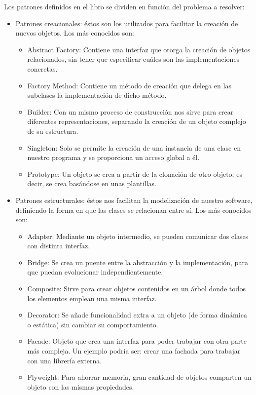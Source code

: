\documentclass[12pt]{report} %
\begin{document}
	 Los patrones definidos en el libro \cite{gamma2002patrones} se dividen en función del problema a resolver:
	 
	 \begin{itemize}
	 	\item Patrones creacionales: éstos son los utilizados para facilitar la creación de nuevos objetos. Los más conocidos son:	 	
	 	\begin{itemize}
	 		\item Abstract Factory: Contiene una interfaz que otorga la creación de objetos relacionados, sin tener que especificar cuáles son las implementaciones concretas.
	 		\item Factory Method: Contiene un método de creación que delega en las subclases la implementación de dicho método.
	 		\item Builder: Con un mismo proceso de construcción nos sirve para crear diferentes representaciones, separando la creación de un objeto complejo de su estructura.
	 		\item Singleton: Solo se permite la creación de una instancia de una clase en nuestro programa y se proporciona un acceso global a él.
	 		\item Prototype: Un objeto se crea a partir de la clonación de otro objeto, es decir, se crea basándose en unas plantillas.
	 	\end{itemize}
 	\item Patrones estructurales: éstos nos facilitan la modelización de nuestro software, definiendo la forma en que las clases se relacionan entre sí. Los más conocidos son:
 	\begin{itemize}
 		\item Adapter: Mediante un objeto intermedio, se pueden comunicar dos clases con distinta interfaz. 
 		\item Bridge: Se crea un puente entre la abstracción y la implementación, para que puedan evolucionar independientemente.
 		\item Composite: Sirve para crear objetos contenidos en un árbol donde todos los elementos emplean una misma interfaz.
 		\item Decorator: Se añade funcionalidad extra a un objeto (de forma dinámica o estática) sin cambiar su comportamiento.
 		\item Facade: Objeto que crea una interfaz para poder trabajar con otra parte más compleja. Un ejemplo podría ser: crear una fachada para trabajar con una librería externa.
 		\item Flyweight: Para ahorrar memoria, gran cantidad de objetos comparten un objeto con las mismas propiedades.

\end{itemize}
\end{itemize}
\end{document}
